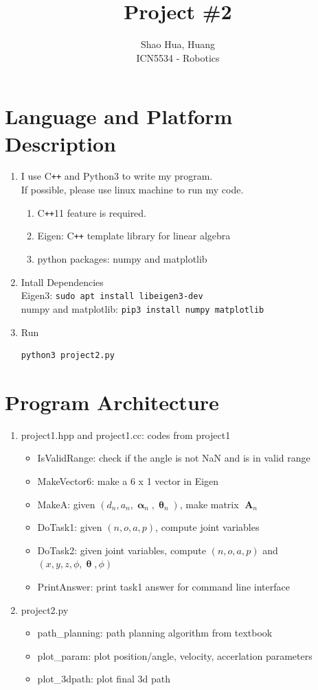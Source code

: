 \documentclass[12pt]{article}
\title{Project \#2}
\author{Shao Hua, Huang\\
ICN5534 - Robotics}
\DeclareMathOperator{\A}{\mathbf{A}}
\DeclareMathOperator{\al}{\mathbf{\alpha}}
\DeclareMathOperator{\Th}{\mathbf{\theta}}
\begin{document}
\maketitle
\section{Language and Platform Description}
\begin{enumerate}
  \item
  I use C\texttt{++} and Python3 to write my program.\\
  If possible, please use linux machine to run my code.
  \begin{enumerate}
    \item C\texttt{++}11 feature is required.
    \item Eigen: C\texttt{++} template library for linear algebra
    \item python packages: numpy and matplotlib
  \end{enumerate}
  \item Intall Dependencies\\
  Eigen3: \lstinline{sudo apt install libeigen3-dev}\\
  numpy and matplotlib: \lstinline{pip3 install numpy matplotlib}
  \item Run
  \begin{lstlisting}[language=bash]
python3 project2.py
  \end{lstlisting}
\end{enumerate}
\section{Program Architecture}
\begin{enumerate}
  \item project1.hpp and project1.cc: codes from project1
    \begin{itemize}
      \item IsValidRange: check if the angle is not NaN and is in valid range
      \item MakeVector6: make a 6 x 1 vector in Eigen
      \item MakeA: given $(d_n, a_n, \al_n, \Th_n)$, make matrix $\A_n$
      \item DoTask1: given $(n, o, a, p)$, compute joint variables
      \item DoTask2: given joint variables, compute $(n, o, a, p)$ and $(x, y, z, \phi, \Th, \phi)$
      \item PrintAnswer: print task1 answer for command line interface
    \end{itemize}
  \item project2.py
    \begin{itemize}
      \item path\_planning: path planning algorithm from textbook
      \item plot\_param: plot position/angle, velocity, accerlation parameters
      \item plot\_3dpath: plot final 3d path
    \end{itemize}
\end{enumerate}
\end{document}
